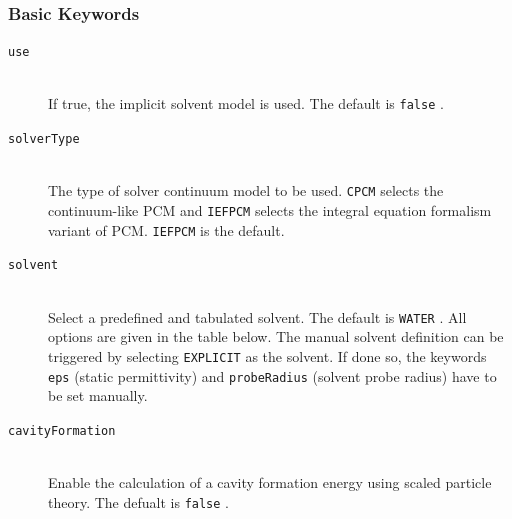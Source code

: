 \documentclass[bibliography=totocnumbered,a4paper,10pt,oneside]{scrbook}
\newcommand{\ttt}[1]{%
  \begingroup\setlength{\fboxsep}{1pt}%
  \colorbox{serenity-green!30}{\texttt{\hspace*{2pt}\vphantom{(g}#1\hspace*{2pt}}}%
  \endgroup
}
\begin{document}
\subsubsection{Basic Keywords}
\begin{description}
  \item [\texttt{use}]\hfill \\
  If true, the implicit solvent model is used. The default is \ttt{false}.
 \item [\texttt{solverType}]\hfill \\
 The type of solver continuum model to be used. \ttt{CPCM} selects the continuum-like PCM and 
 \ttt{IEFPCM} selects the integral equation formalism variant of PCM. \ttt{IEFPCM} is the default.
 \item [\texttt{solvent}]\hfill \\
 Select a predefined and tabulated solvent. The default is \ttt{WATER}. All options are given in the table below.
 The manual solvent definition can be triggered by selecting \ttt{EXPLICIT} as the solvent. If done so, the keywords 
 \ttt{eps} (static permittivity) and \ttt{probeRadius} (solvent probe radius) have to be set manually.
 \item [\texttt{cavityFormation}]\hfill \\
 Enable the calculation of a cavity formation energy using scaled particle theory. The defualt
 is \ttt{false}.
\end{description}
\end{document}
